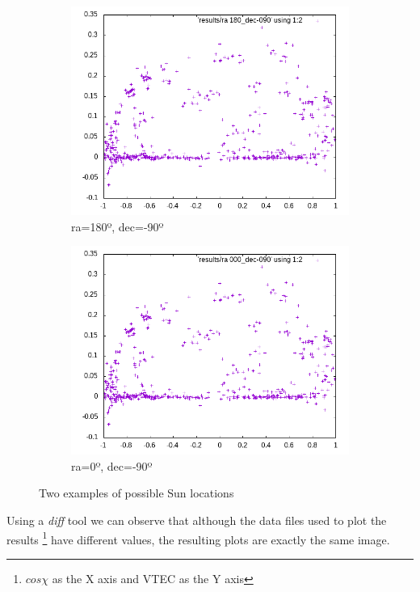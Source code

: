 \begin{figure}[!htb]
	\begin{subfigure}[b]{0.5\textwidth}
		\includegraphics[width=\linewidth]{images/ch4/ra180_dec-090.png}
		\caption{ra=180º, dec=-90º}
	\end{subfigure}
	\hfill
	\begin{subfigure}[b]{0.5\textwidth}
		\includegraphics[width=\linewidth]{images/ch4/ra000_dec-090.png}
		\caption{ra=0º, dec=-90º}
	\end{subfigure}
	\caption{Two examples of possible Sun locations}
	\label{fig:poles}
\end{figure}

Using a \textit{diff} tool we can observe that although the data files used to plot the results \footnote{$cos\chi$ as the X axis and VTEC as the Y axis} have different values, the resulting plots are exactly the same image.

